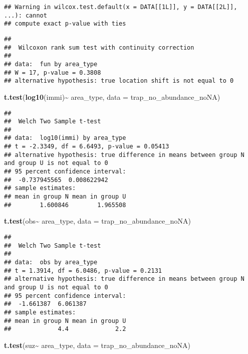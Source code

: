 \documentclass[
]{article}
\newenvironment{Shaded}{\begin{snugshade}}{\end{snugshade}}
\newcommand{\AttributeTok}[1]{\textcolor[rgb]{0.13,0.29,0.53}{#1}}
\newcommand{\FunctionTok}[1]{\textcolor[rgb]{0.13,0.29,0.53}{\textbf{#1}}}
\newcommand{\NormalTok}[1]{#1}
\newcommand{\SpecialCharTok}[1]{\textcolor[rgb]{0.81,0.36,0.00}{\textbf{#1}}}
\begin{document}
\begin{verbatim}
## Warning in wilcox.test.default(x = DATA[[1L]], y = DATA[[2L]], ...): cannot
## compute exact p-value with ties
\end{verbatim}

\begin{verbatim}
## 
##  Wilcoxon rank sum test with continuity correction
## 
## data:  fun by area_type
## W = 17, p-value = 0.3808
## alternative hypothesis: true location shift is not equal to 0
\end{verbatim}

\begin{Shaded}
\begin{Highlighting}[]
\FunctionTok{t.test}\NormalTok{(}\FunctionTok{log10}\NormalTok{(immi)}\SpecialCharTok{\textasciitilde{}}\NormalTok{ area\_type, }\AttributeTok{data =}\NormalTok{ trap\_no\_abundance\_noNA)}
\end{Highlighting}
\end{Shaded}

\begin{verbatim}
## 
##  Welch Two Sample t-test
## 
## data:  log10(immi) by area_type
## t = -2.3349, df = 6.6493, p-value = 0.05413
## alternative hypothesis: true difference in means between group N and group U is not equal to 0
## 95 percent confidence interval:
##  -0.737945565  0.008622942
## sample estimates:
## mean in group N mean in group U 
##        1.600846        1.965508
\end{verbatim}

\begin{Shaded}
\begin{Highlighting}[]
\FunctionTok{t.test}\NormalTok{(obs}\SpecialCharTok{\textasciitilde{}}\NormalTok{ area\_type, }\AttributeTok{data =}\NormalTok{ trap\_no\_abundance\_noNA)}
\end{Highlighting}
\end{Shaded}

\begin{verbatim}
## 
##  Welch Two Sample t-test
## 
## data:  obs by area_type
## t = 1.3914, df = 6.0486, p-value = 0.2131
## alternative hypothesis: true difference in means between group N and group U is not equal to 0
## 95 percent confidence interval:
##  -1.661387  6.061387
## sample estimates:
## mean in group N mean in group U 
##             4.4             2.2
\end{verbatim}

\begin{Shaded}
\begin{Highlighting}[]
\FunctionTok{t.test}\NormalTok{(suz}\SpecialCharTok{\textasciitilde{}}\NormalTok{ area\_type, }\AttributeTok{data =}\NormalTok{ trap\_no\_abundance\_noNA)}
\end{Highlighting}
\end{Shaded}
\end{document}
